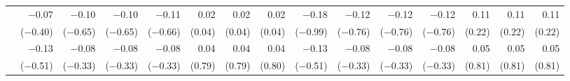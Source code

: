\begin{tabularx}{1.45\textwidth}{lRRRRRRRRRRRRRR}
		 & \num{-0.07}\phantom{***)} & \num{-0.10}\phantom{***)} & \num{-0.10}\phantom{***)} & \num{-0.11}\phantom{***)} & \num{0.02}\phantom{***)} & \num{0.02}\phantom{***)} & \num{0.02}\phantom{***)} & \num{-0.18}\phantom{***)} & \num{-0.12}\phantom{***)} & \num{-0.12}\phantom{***)} & \num{-0.12}\phantom{***)} & \num{0.11}\phantom{***)} & \num{0.11}\phantom{***)} & \num{0.11}\phantom{***)} \\
		 & (\num{-0.40})\phantom{***} & (\num{-0.65})\phantom{***} & (\num{-0.65})\phantom{***} & (\num{-0.66})\phantom{***} & (\num{0.04})\phantom{***} & (\num{0.04})\phantom{***} & (\num{0.04})\phantom{***} & (\num{-0.99})\phantom{***} & (\num{-0.76})\phantom{***} & (\num{-0.76})\phantom{***} & (\num{-0.76})\phantom{***} & (\num{0.22})\phantom{***} & (\num{0.22})\phantom{***} & (\num{0.22})\phantom{***} \\ [\dspacing]
		 & \num{-0.13}\phantom{***)} & \num{-0.08}\phantom{***)} & \num{-0.08}\phantom{***)} & \num{-0.08}\phantom{***)} & \num{0.04}\phantom{***)} & \num{0.04}\phantom{***)} & \num{0.04}\phantom{***)} & \num{-0.13}\phantom{***)} & \num{-0.08}\phantom{***)} & \num{-0.08}\phantom{***)} & \num{-0.08}\phantom{***)} & \num{0.05}\phantom{***)} & \num{0.05}\phantom{***)} & \num{0.05}\phantom{***)} \\
		 & (\num{-0.51})\phantom{***} & (\num{-0.33})\phantom{***} & (\num{-0.33})\phantom{***} & (\num{-0.33})\phantom{***} & (\num{0.79})\phantom{***} & (\num{0.79})\phantom{***} & (\num{0.80})\phantom{***} & (\num{-0.51})\phantom{***} & (\num{-0.33})\phantom{***} & (\num{-0.33})\phantom{***} & (\num{-0.33})\phantom{***} & (\num{0.81})\phantom{***} & (\num{0.81})\phantom{***} & (\num{0.81})\phantom{***} \\ [\dspacing]
        \bottomrule
    \end{tabularx}%